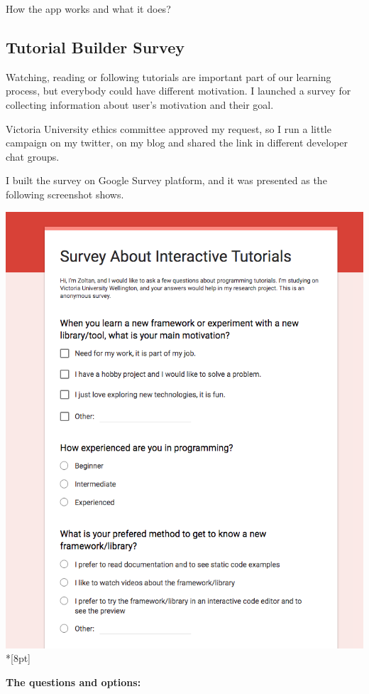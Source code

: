 \documentclass[12pt, a4paper, oneside, openright, medskipamount]{report}
\begin{document}
How the app works and what it does?



\subsection{Tutorial Builder Survey}

Watching, reading or following tutorials are important part of our learning process, but everybody could have different motivation. I launched a survey for collecting information about user's motivation and their goal.

Victoria University ethics committee approved my request, so I run a little campaign on my twitter, on my blog and shared the link in different developer chat groups.

I built the survey on Google Survey platform, and it was presented as the following screenshot shows.

\includegraphics[width=1\textwidth]{assets/survey-screenshot.png}\\*[8pt]

\textbf{The questions and options:}
\end{document}
